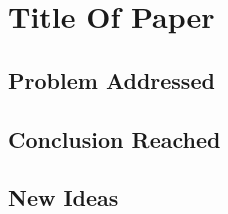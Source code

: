 \documentclass[../main.tex]{subfiles}
\begin{document}
\section{Title Of Paper}  \label{give_a_label_here}
\subsection{Problem Addressed}
\subsection{Conclusion Reached}
\subsection{New Ideas}
\end{document}
